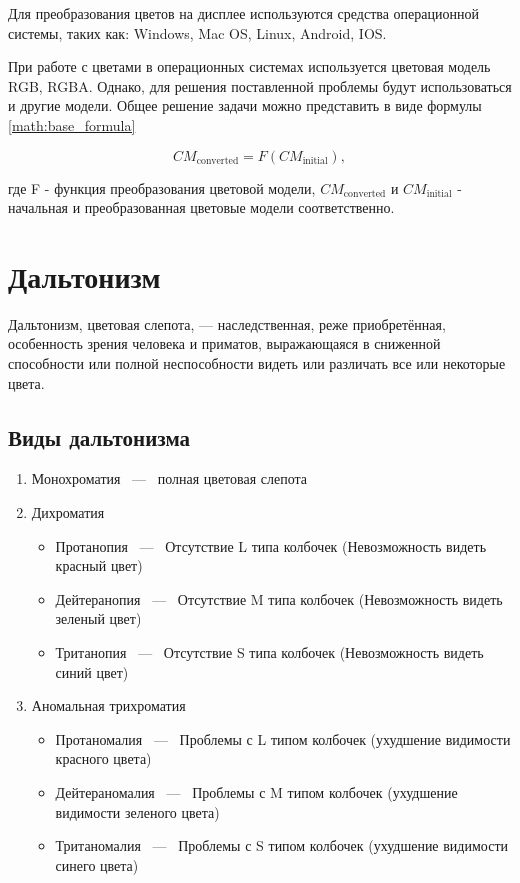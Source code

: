\documentclass[a4paper,14pt, unknownkeysallowed]{extreport}
\begin{document}
    Для преобразования цветов на дисплее используются средства операционной системы, таких как: Windows, Mac OS, Linux, Android, IOS.
    
    При работе с цветами в операционных системах используется цветовая модель RGB, RGBA. Однако, для решения поставленной проблемы будут использоваться и другие модели. Общее решение задачи можно представить в виде формулы \ref{math:base_formula}

    \begin{equation}
        CM_{\text{converted}} = F(CM_{\text{initial}}),
    \end{equation}
    \label{math:base_formula}

    \noindent
    где F - функция преобразования цветовой модели, $CM_{\text{converted}}$ и $CM_{\text{initial}}$ - начальная и преобразованная цветовые модели соответственно.

    \section{Дальтонизм}
    Дальтонизм, цветовая слепота, — наследственная, реже приобретённая, особенность зрения человека и приматов, выражающаяся в сниженной способности или полной неспособности видеть или различать все или некоторые цвета.
    
    \subsection{Виды дальтонизма}
    \begin{enumerate}
        \item Монохроматия ~---~ полная цветовая слепота
        \item Дихроматия
        \begin{itemize}
            \item Протанопия ~---~ Отсутствие L типа колбочек (Невозможность видеть красный цвет)
            \item Дейтеранопия ~---~ Отсутствие M типа колбочек (Невозможность видеть зеленый цвет)
            \item Тританопия ~---~ Отсутствие S типа колбочек (Невозможность видеть синий цвет)
        \end{itemize}
        \item Аномальная трихроматия
        \begin{itemize}
            \item Протаномалия ~---~ Проблемы с L типом колбочек (ухудшение видимости красного цвета)
            \item Дейтераномалия ~---~ Проблемы с M типом колбочек (ухудшение видимости зеленого цвета)
            \item Тританомалия ~---~ Проблемы с S типом колбочек (ухудшение видимости синего цвета)
        \end{itemize}
    \end{enumerate}
\end{document}
